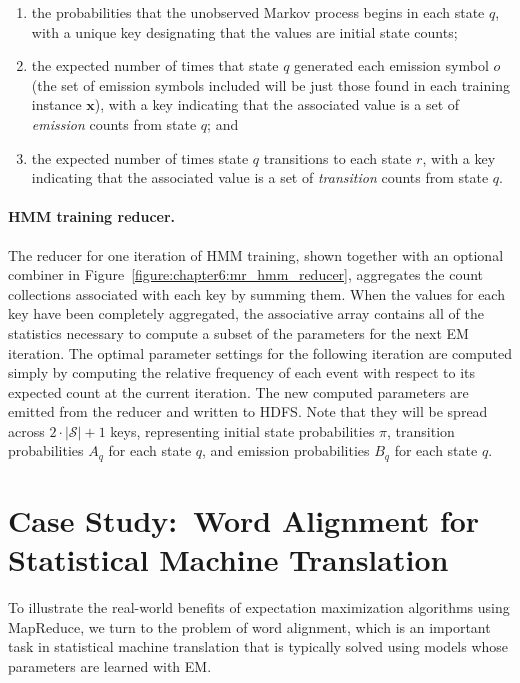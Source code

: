 \begin{enumerate}
\item the probabilities that the unobserved Markov process begins in
  each state $q$, with a unique key designating that the values are
  initial state counts;

\item the expected number of times that state $q$ generated each
  emission symbol $o$ (the set of emission symbols included will be
  just those found in each training instance $\textbf{x}$), with a key
  indicating that the associated value is a set of \emph{emission}
  counts from state $q$; and

\item the expected number of times state $q$ transitions to each state
  $r$, with a key indicating that the associated value is a set of
  \emph{transition} counts from state $q$.

\end{enumerate}

\paragraph{\textbf{HMM training reducer.}}
The reducer for one iteration of HMM training, shown together with an
optional combiner in Figure~\ref{figure:chapter6:mr_hmm_reducer},
aggregates the count collections associated with each key by summing
them.  When the values for each key have been completely aggregated,
the associative array contains all of the statistics necessary to
compute a subset of the parameters for the next EM iteration.  The
optimal parameter settings for the following iteration are computed
simply by computing the relative frequency of each event with respect
to its expected count at the current iteration.  The new computed
parameters are emitted from the reducer and written to HDFS.  Note
that they will be spread across $2\cdot | \mathcal{S} |+1$ keys,
representing initial state probabilities $\pi$, transition
probabilities $A_q$ for each state $q$, and emission probabilities
$B_q$ for each state $q$.


\section{Case Study:\ Word Alignment for Statistical Machine Translation}
\label{chapter6_word_alignment}

To illustrate the real-world benefits of expectation maximization
algorithms using MapReduce, we turn to the problem of word alignment,
which is an important task in statistical machine translation that is
typically solved using models whose parameters are learned with EM.

